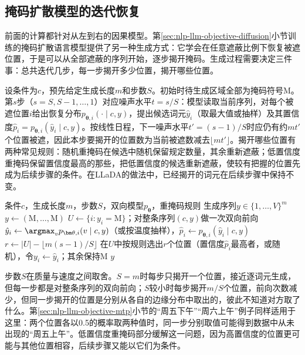 \subsection{掩码扩散模型的迭代恢复}
\label{sec:nlp-inference-masked-restoration}

前面的计算都针对从左到右的因果模型。第\ref{sec:nlp-llm-objective-diffusion}小节训练的掩码扩散语言模型提供了另一种生成方式：它学会在任意遮蔽比例下恢复被遮位置，于是可以从全部遮蔽的序列开始，逐步揭开掩码。生成过程需要决定三件事：总共迭代几步，每一步揭开多少位置，揭开哪些位置。

设条件为$c$，预先给定生成长度$m$和步数$S$。初始时待生成区域全部为掩码符号$\mathrm M$。第$s$步（$s=S,S-1,\ldots,1$）对应噪声水平$t=s/S$：模型读取当前序列，对每个被遮位置$i$给出恢复分布$p_{\bm\theta,i}(\cdot\mid c,y)$，提出候选词元$\hat y_i$（取最大值或抽样）及其置信度$\hat p_i=p_{\bm\theta,i}(\hat y_i\mid c,y)$。按线性日程，下一噪声水平$t'=(s-1)/S$时应仍有约$mt'$个位置被遮，因此本步要揭开的位置数为当前被遮数减去$\lfloor mt'\rfloor$。揭开哪些位置有两种常见规则：随机重掩码在候选中随机保留规定数量，其余重新遮蔽；低置信度重掩码保留置信度最高的那些，把低置信度的候选重新遮蔽，使较有把握的位置先成为后续步骤的条件。在LLaDA的做法中，已经揭开的词元在后续步骤中保持不变。

\begin{algorithm}[掩码扩散语言模型的迭代恢复生成]
  \label{alg:nlp-inference-masked-diffusion}
  \begin{algorithmic}[1]
    \Require 条件$c$，生成长度$m$，步数$S$，双向模型$p_{\bm\theta}$，重掩码规则
    \Ensure 生成序列$y\in\{1,\ldots,V\}^m$
    \State $y\gets(\mathrm M,\ldots,\mathrm M)$
      \State $U\gets\{i:y_i=\mathrm M\}$；对整条序列$(c,y)$做一次双向前向
        \State $\hat y_i\gets\argmax_vp_{\bm\theta,i}(v\mid c,y)$（或按温度抽样），$\hat p_i\gets p_{\bm\theta,i}(\hat y_i\mid c,y)$
      \EndFor
      \State $r\gets|U|-\lfloor m(s-1)/S\rfloor$
      \State 在$U$中按规则选出$r$个位置（置信度$\hat p_i$最高者，或随机），令$y_i\gets\hat y_i$；其余保持$\mathrm M$
    \EndFor
    \State \Return $y$
  \end{algorithmic}
\end{algorithm}

步数$S$在质量与速度之间取舍。$S=m$时每步只揭开一个位置，接近逐词元生成，但每一步都是对整条序列的双向前向；$S$较小时每步揭开$m/S$个位置，前向次数减少，但同一步揭开的位置是分别从各自的边缘分布中取出的，彼此不知道对方取了什么。第\ref{sec:nlp-llm-objective-mtp}小节的“周五下午”“周六上午”例子同样适用于这里：两个位置各以0.5的概率取两种值时，同一步分别取值可能得到数据中从未出现的“周五上午”。低置信度重掩码部分缓解这一问题，因为高置信度的位置更可能与其他位置相容，后续步骤又能以它们为条件。

